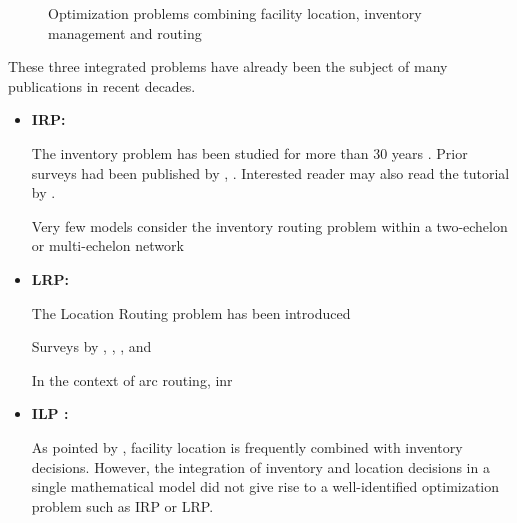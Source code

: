 \documentclass[a4paper,10pt]{article}
\begin{document}
\begin{linenumbers}
\begin{figure}[htbp]
	\caption{Optimization problems combining facility location, inventory management and routing}
	\label{fig:circles}
	\end{figure} 

These three integrated problems have already been the subject of many publications in recent decades.

\begin{itemize}
	
	\item \textbf{IRP: }
	
	The inventory problem has been studied for more than 30 years \cite{Coelho2014}. Prior surveys had been published by \cite{Campbell98}, \cite{MoinSalhi2007}. Interested reader may also read the tutorial by \cite{Bertazzi2012}. 
	
	Very few models consider the inventory routing problem within a two-echelon or multi-echelon network	\cite{GuimaraesCoelho2019}
	
	\item \textbf{LRP: }
	
	The Location Routing problem has been introduced 
	
		
	
	\cite{Laporte1987} 
	
	Surveys by \cite{MinJS98}, \cite{NagySahli07}, \cite{ProdhonPrins2014}, \cite{DrexlSchneider2015} and \cite{Schneider2017} 
	
	
	
In the context of arc routing, 	\cite{Riquelme2016} inr

	
	
	\item \textbf{ILP : }
	
	As pointed by \cite{Melo2009}, facility location is frequently combined with inventory decisions. However, the integration of inventory and location decisions in a single mathematical model did not give rise to a well-identified optimization problem such as IRP or LRP. 
	
	
\end{itemize}


\end{linenumbers}
\end{document}
